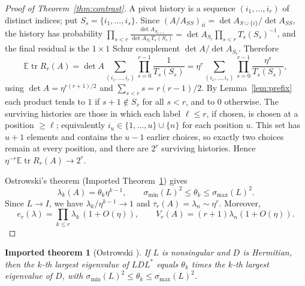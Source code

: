 \documentclass[11pt,a4paper]{article}
\newtheorem{imported}[theorem]{Imported theorem}
\theoremstyle{definition}
\newcommand{\E}{\mathbb{E}}
\newcommand{\tr}{\operatorname{tr}}
\begin{document}
\begin{proof}[Proof of Theorem~\ref{thm:contrast}]
A pivot history is a sequence $(i_1,\dots,i_r)$ of distinct indices; put $S_s=\{i_1,\dots,i_s\}$. Since $(A/A_{SS})_{ii}=\det A_{S\cup\{i\}}/\det A_{SS}$, the history has probability $\prod_{s<r}\frac{\det A_{S_{s+1}}}{\det A_{S_s}T_s(S_s)}=\det A_{S_r}\prod_{s<r}T_s(S_s)^{-1}$, and the final residual is the $1\times1$ Schur complement $\det A/\det A_{S_r}$. Therefore
\[
\E\tr R_r(A)=\det A\sum_{(i_1,\dots,i_r)}\prod_{s=0}^{r-1}\frac1{T_s(S_s)}=\eta^r\sum_{(i_1,\dots,i_r)}\prod_{s=0}^{r-1}\frac{\eta^s}{T_s(S_s)},
\]
using $\det A=\eta^{r(r+1)/2}$ and $\sum_{s<r}s=r(r-1)/2$. By Lemma~\ref{lem:prefix} each product tends to $1$ if $s+1\notin S_s$ for all $s<r$, and to $0$ otherwise. The surviving histories are those in which each label $\ell\le r$, if chosen, is chosen at a position $\ge\ell$; equivalently $i_u\in\{1,\dots,u\}\cup\{n\}$ for each position $u$. This set has $u+1$ elements and contains the $u-1$ earlier choices, so exactly two choices remain at every position, and there are $2^r$ surviving histories. Hence $\eta^{-r}\E\tr R_r(A)\to2^r$.

Ostrowski's theorem (Imported Theorem~\ref{imp:ostrowski}) gives
\[
\lambda_k(A)=\theta_k\eta^{k-1},\qquad
\sigma_{\min}(L)^2\le\theta_k\le\sigma_{\max}(L)^2.
\]
Since $L\to I$, we have $\lambda_k/\eta^{k-1}\to1$ and $\tau_r(A)=\lambda_n\sim\eta^r$. Moreover,
\[
e_r(\lambda)=\prod_{k\le r}\lambda_k\,(1+O(\eta)),\qquad
V_r(A)=(r+1)\lambda_n(1+O(\eta)).
\]
\end{proof}

\begin{imported}[Ostrowski {\cite[Thm.~4.5.9]{HJ}}]\label{imp:ostrowski}
If $L$ is nonsingular and $D$ is Hermitian, then the $k$-th largest eigenvalue of $LDL^*$ equals $\theta_k$ times the $k$-th largest eigenvalue of $D$, with $\sigma_{\min}(L)^2\le\theta_k\le\sigma_{\max}(L)^2$.
\end{imported}
\end{document}
